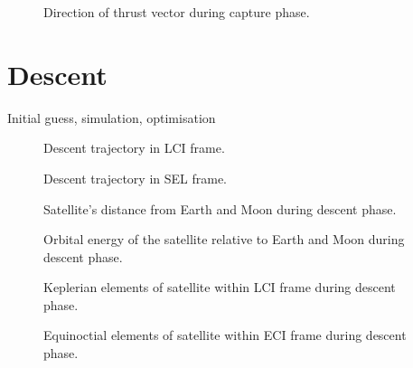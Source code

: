 \begin{figure}
\centering
\def\svgwidth{\figurewidth}

\caption{Direction of thrust vector during capture phase.}
\label{fig:Capture-thrust}
\end{figure}


\clearpage

\section{Descent}
Initial guess, simulation, optimisation

\begin{figure}
\centering
\def\svgwidth{\figurewidth}

\caption{Descent trajectory in LCI frame.}
\label{fig:Descent-3D-lci}
\end{figure}

\begin{figure}
\centering
\def\svgwidth{\figurewidth}

\caption{Descent trajectory in SEL frame.}
\label{fig:Descent-3D-sel}
\end{figure}

\begin{figure}
\centering
\def\svgwidth{\figurewidth}

\caption{Satellite's distance from Earth and Moon during descent phase.}
\label{fig:Descent-dist}
\end{figure}

\begin{figure}
\centering
\def\svgwidth{\figurewidth}

\caption{Orbital energy of the satellite relative to Earth and Moon during descent phase.}
\label{fig:Descent-orbeng}
\end{figure}

\begin{figure}
\centering
\def\svgwidth{\figurewidth}

\caption{Keplerian elements of satellite within LCI frame during descent phase.}
\label{fig:Descent-kep-lci}
\end{figure}

\begin{figure}
\centering
\def\svgwidth{\figurewidth}

\caption{Equinoctial elements of satellite within ECI frame during descent phase.}
\label{fig:Descent-mee}
\end{figure}

